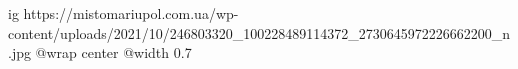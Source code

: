  
 
 
 
 

\ifcmt
  ig https://mistomariupol.com.ua/wp-content/uploads/2021/10/246803320_100228489114372_2730645972226662200_n.jpg
  @wrap center
  @width 0.7
\fi
